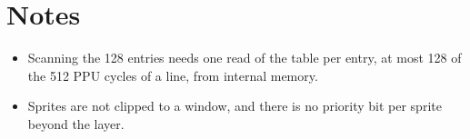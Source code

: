 \section{Notes}

\begin{itemize}
	\item Scanning the 128 entries needs one read of the table per entry, at most 128 of the 512 PPU cycles of a line, from
	      internal memory.
	\item Sprites are not clipped to a window, and there is no priority bit per sprite beyond the layer.
\end{itemize}
